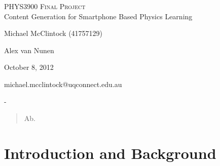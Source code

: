 \documentclass[12pt,a4paper]{article}  %
\begin{document}
\begin{titlepage}
\begin{center}
\textsc{\LARGE PHYS3900 Final Project}\\[1cm]
{\LARGE Content Generation for Smartphone Based Physics Learning}\\[2cm]
\begin{minipage}[t]{0.6\columnwidth} \large
\begin{description}
\itemsep2mm
\small
\item [\emph{Author:}] Michael McClintock (41757129)
\item [\emph{Partner:}] Alex van Nunen
\item [\emph{Date:}] October 8, 2012
\item [\emph{Email:}] michael.mcclintock@uqconnect.edu.au
\item [\emph{Supervisors:}] -
\end{description}
\end{minipage}
\vfill
\end{center}
\end{titlepage}

\begin{abstract}
Ab.
\end{abstract}
\thispagestyle{empty}
\newpage

\tableofcontents
\thispagestyle{empty}
\newpage
\setcounter{page}{1}

\section{Introduction and Background}


\end{document}

